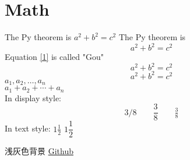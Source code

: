 \documentclass[cn,hazy,blue,11pt,screen]{elegantnote}
\begin{document}
\section{Math}
The Py theorem is $a^2 + b^2 = c^2$
The Py theorem is
\begin{equation}
   a^2 + b^2 = c^2\label{1}
\end{equation}
Equation \eqref{1} is called "Gou"
\begin{equation}
   a^2 + b^2 = c^2\tag{yes}
\end{equation}
\[a^2 + b^2 = c^2\]
$a_1, a_2, \dots, a_n$\\
$a_1 + a_2 + \cdots + a_n$\\
In display style:
\[
  3/8 \qquad \frac{3}{8}
  \qquad \tfrac{3}{8}
\]
In text style:
$1\frac{1}{2}$
$1\dfrac{1}{2}$

\colorbox[gray]{0.95}{浅灰色背景}
\href{http://github.com}{Github}
\end{document}
